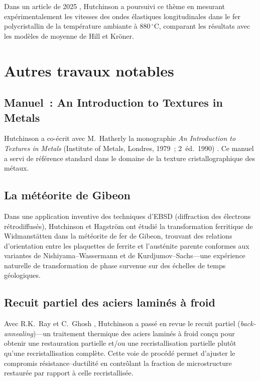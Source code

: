 \documentclass[11pt,a4paper]{article}
\begin{document}
Dans un article de 2025 \cite{Hutchinson2025pssb}, Hutchinson a
poursuivi ce th\`eme en mesurant exp\'erimentalement les vitesses des
ondes \'elastiques longitudinales dans le fer polycristallin de la
temp\'erature ambiante \`a $880\,{}^\circ\mathrm{C}$, comparant les
r\'esultats avec les mod\`eles de moyenne de Hill et Kr\"oner.

\section{Autres travaux notables}
\label{sec:other}

\subsection{Manuel~: An Introduction to Textures in Metals}

Hutchinson a co-\'ecrit avec M.~Hatherly la monographie \emph{An
Introduction to Textures in Metals} (Institute of Metals, Londres,
1979~; 2\ieme{}~\'ed.\ 1990) \cite{Hatherly1979}.  Ce manuel a servi de
r\'ef\'erence standard dans le domaine de la texture cristallographique
des m\'etaux.

\subsection{La m\'et\'eorite de Gibeon}

Dans une application inventive des techniques d'EBSD (diffraction des
\'electrons r\'etrodiffus\'es), Hutchinson et Hagstr\"om
\cite{Hutchinson2006Met} ont \'etudi\'e la transformation ferritique de
Widmanst\"atten dans la m\'et\'eorite de fer de Gibeon, trouvant des
relations d'orientation entre les plaquettes de ferrite et l'aust\'enite
parente conformes aux variantes de Nishiyama--Wassermann et de
Kurdjumov--Sachs---une exp\'erience naturelle de transformation de phase
survenue sur des \'echelles de temps g\'eologiques.

\subsection{Recuit partiel des aciers lamin\'es \`a froid}

Avec R.K.~Ray et C.~Ghosh \cite{Ray2011}, Hutchinson a pass\'e en revue
le recuit partiel (\emph{back-annealing})---un traitement thermique des
aciers lamin\'es \`a froid con\c{c}u pour obtenir une restauration
partielle et/ou une recristallisation partielle plut\^ot qu'une
recristallisation compl\`ete.  Cette voie de proc\'ed\'e permet
d'ajuster le compromis r\'esistance--ductilit\'e en contr\^olant la
fraction de microstructure restaur\'ee par rapport \`a celle
recristallis\'ee.
\end{document}
